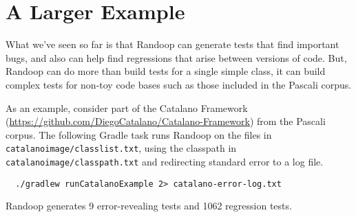 \documentclass[11pt, oneside]{article} %
\begin{document}
\section{A Larger Example}\label{largerexample}
What we've seen so far is that Randoop can generate tests that find important bugs, and also can help find regressions that arise between versions of code. 
But, Randoop can do more than build tests for a single simple class, it can build complex tests for non-toy code bases such as those included in the Pascali corpus.

As an example, consider part of the Catalano Framework
(\url{https://github.com/DiegoCatalano/Catalano-Framework}) from the
Pascali corpus.
The following Gradle task runs Randoop on the files in \texttt{catalanoimage/classlist.txt},
using the classpath in \texttt{catalanoimage/classpath.txt}
and redirecting standard error to a log file.
\begin{verbatim}
  ./gradlew runCatalanoExample 2> catalano-error-log.txt
\end{verbatim}
Randoop generates 9 error-revealing tests and 1062 regression tests.
\end{document}
